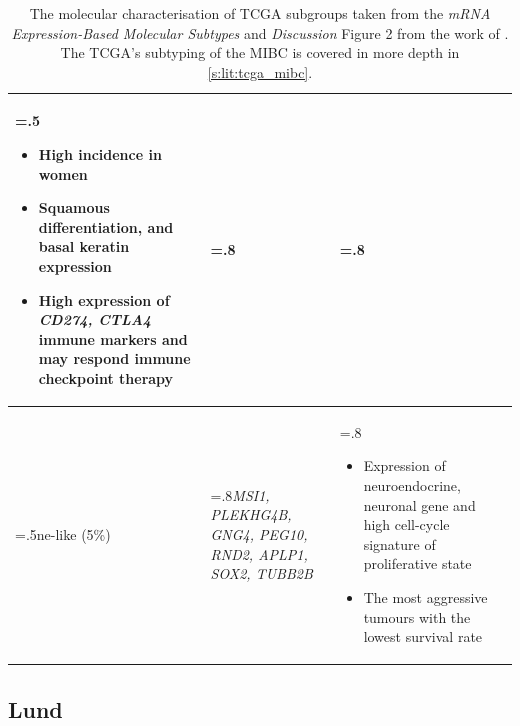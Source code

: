 \begin{table}[!htb]
\begin{tabularx}{\textwidth}{ >{\hsize=.5\hsize}X |>{\hsize=.8\hsize}X |>{\hsize=.8\hsize}X}
\begin{itemize}[leftmargin=*, nosep, after=\vspace{-\baselineskip}, before=\vspace{-.6\baselineskip}]
        \item High incidence in women
        \item Squamous differentiation, and basal keratin expression
        \item High expression of \textit{CD274, CTLA4} immune markers and may respond immune checkpoint therapy
    \end{itemize} \\
    \midrule
    \acrlong{ne-like} (5\%) &\textit{MSI1, PLEKHG4B, GNG4, PEG10, RND2, APLP1, SOX2, TUBB2B} & 
    \begin{itemize}[leftmargin=*, nosep, after=\vspace{-\baselineskip}, before=\vspace{-.6\baselineskip}]
        \item Expression of neuroendocrine, neuronal gene and high cell-cycle signature of proliferative state
        \item The most aggressive tumours with the lowest survival rate
    \end{itemize} \\
    \bottomrule
    \end{tabularx}
    \caption[Summary table of TCGA subtypes]{The molecular characterisation of TCGA subgroups taken from the \textit{mRNA Expression-Based Molecular Subtypes} and \textit{Discussion} Figure 2 from the work of \cite{Robertson2017-mg}. The TCGA's subtyping of the MIBC is covered in more depth in \cref{s:lit:tcga_mibc}.}
    \label{tab:lit:tcga_genes}
\end{table}

\subsection{Lund}

